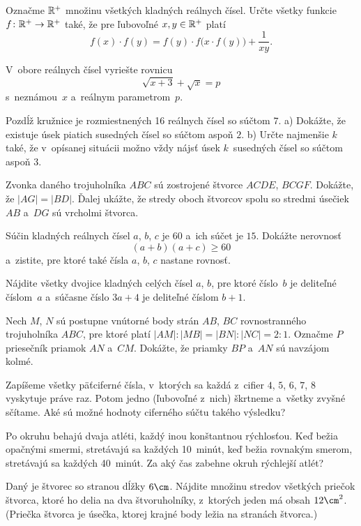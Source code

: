 {%
Označme $\Bbb R^+$ množinu všetkých kladných reálnych čísel.
Určte všetky funkcie $f\colon\Bbb R^{+}\to \Bbb R^{+}$ také, že pre ľubovoľné
$x,y\in \Bbb R^{+}$ platí
$$
f(x)\cdot f(y)=f(y)\cdot f\bigl(x\cdot f(y)\bigr)+\frac{1}{xy}.
$$}

{%
V~obore reálnych čísel vyriešte rovnicu
$$
\sqrt{x+3}+\sqrt{x}=p
$$
s~neznámou~$x$ a~reálnym parametrom~$p$.}

{%
Pozdĺž kružnice je rozmiestnených 16 reálnych čísel so súčtom $7$.
\ite a) Dokážte, že existuje úsek piatich susedných čísel so súčtom aspoň $2$.
\ite b) Určte najmenšie $k$ také, že v~opísanej situácii možno vždy nájsť úsek $k$~susedných čísel so súčtom aspoň $3$.\endgraf}

{%
Zvonka daného trojuholníka $ABC$ sú zostrojené štvorce $ACDE$, $BCGF$.
Dokážte, že $|AG|=|BD|$. Ďalej ukážte, že stredy oboch štvorcov spolu so stredmi úsečiek $AB$ a~$DG$ sú vrcholmi štvorca.}

{%
Súčin kladných reálnych čísel $a$, $b$, $c$ je
$60$ a~ich súčet je $15$. Dokážte nerovnosť
$$
(a+b)(a+c)\ge60
$$
a~zistite, pre ktoré také čísla $a$, $b$, $c$
nastane rovnosť.}

{%
Nájdite všetky dvojice kladných celých čísel $a$, $b$, pre ktoré číslo~$b$ je deliteľné číslom~$a$ a~súčasne číslo $3a+4$ je deliteľné číslom $b+1$.}

{%
Nech $M$, $N$ sú postupne vnútorné body strán $AB$, $BC$ rovnostranného trojuholníka $ABC$, pre ktoré platí $|AM|:|MB|=|BN|:|NC|=2:1$.
Označme $P$ priesečník priamok $AN$ a~$CM$. Dokážte, že priamky $BP$ a~$AN$ sú navzájom kolmé.}

{%
Zapíšeme všetky päťciferné čísla, v~ktorých sa každá z~cifier $4$, $5$, $6$, $7$, $8$ vyskytuje práve raz.
Potom jedno (ľubovoľné z~nich) škrtneme a~všetky zvyšné sčítame.
Aké sú možné hodnoty ciferného súčtu takého výsledku?}

{%
Po okruhu behajú dvaja atléti, každý inou konštantnou rýchlosťou. Keď bežia opačnými smermi, stretávajú sa každých 10~minút, keď bežia rovnakým smerom, stretávajú sa každých 40~minút. Za aký čas zabehne okruh rýchlejší atlét?}

{%
Daný je štvorec so stranou dĺžky $6\cm$. Nájdite množinu stredov všetkých priečok štvorca, ktoré ho delia na dva štvoruholníky, z~ktorých jeden má obsah $12\cm^2$. (Priečka štvorca je úsečka, ktorej krajné body ležia na stranách štvorca.)}


